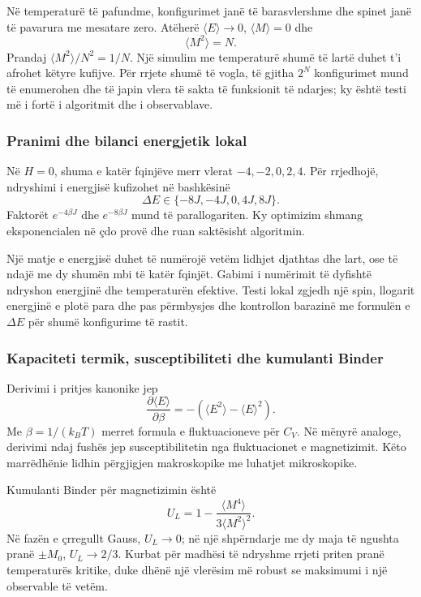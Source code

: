 \documentclass[11pt,oneside,openany]{book}
\begin{document}
Në temperaturë të pafundme, konfigurimet janë të barasvlershme dhe spinet janë të pavarura me mesatare zero. Atëherë $\langle E\rangle\to0$, $\langle M\rangle=0$ dhe
\begin{equation}
 \langle M^2\rangle=N.
\end{equation}
Prandaj $\langle M^2\rangle/N^2=1/N$. Një simulim me temperaturë shumë të lartë duhet t'i afrohet këtyre kufijve. Për rrjete shumë të vogla, të gjitha $2^N$ konfigurimet mund të enumerohen dhe të japin vlera të sakta të funksionit të ndarjes; ky është testi më i fortë i algoritmit dhe i observablave.

\subsubsection{Pranimi dhe bilanci energjetik lokal}
Në $H=0$, shuma e katër fqinjëve merr vlerat $-4,-2,0,2,4$. Për rrjedhojë, ndryshimi i energjisë kufizohet në bashkësinë
\begin{equation}
 \Delta E\in\{-8J,-4J,0,4J,8J\}.
\end{equation}
Faktorët $e^{-4\beta J}$ dhe $e^{-8\beta J}$ mund të parallogariten. Ky optimizim shmang eksponencialen në çdo provë dhe ruan saktësisht algoritmin.

Një matje e energjisë duhet të numërojë vetëm lidhjet djathtas dhe lart, ose të ndajë me dy shumën mbi të katër fqinjët. Gabimi i numërimit të dyfishtë ndryshon energjinë dhe temperaturën efektive. Testi lokal zgjedh një spin, llogarit energjinë e plotë para dhe pas përmbysjes dhe kontrollon barazinë me formulën e $\Delta E$ për shumë konfigurime të rastit.

\subsubsection{Kapaciteti termik, susceptibiliteti dhe kumulanti Binder}
Derivimi i pritjes kanonike jep
\begin{equation}
 \frac{\partial\langle E\rangle}{\partial\beta}
 =-\left(\langle E^2\rangle-\langle E\rangle^2\right).
\end{equation}
Me $\beta=1/(k_BT)$ merret formula e fluktuacioneve për $C_V$. Në mënyrë analoge, derivimi ndaj fushës jep susceptibilitetin nga fluktuacionet e magnetizimit. Këto marrëdhënie lidhin përgjigjen makroskopike me luhatjet mikroskopike.

Kumulanti Binder për magnetizimin është
\begin{equation}
 U_L=1-\frac{\langle M^4\rangle}{3\langle M^2\rangle^2}.
\end{equation}
Në fazën e çrregullt Gauss, $U_L\to0$; në një shpërndarje me dy maja të ngushta pranë $\pm M_0$, $U_L\to2/3$. Kurbat për madhësi të ndryshme rrjeti priten pranë temperaturës kritike, duke dhënë një vlerësim më robust se maksimumi i një observable të vetëm.
\end{document}
